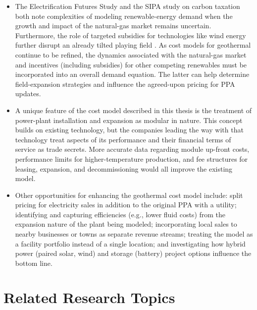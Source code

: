 \begin{itemize}
    \item The Electrification Futures Study \citep{murphy_electrification_2021} and the SIPA study on carbon taxation \citep{larson_energy_2018} both note complexities of modeling renewable-energy demand when the growth and impact of the natural-gas market remains uncertain. Furthermore, the role of targeted subsidies for technologies like wind energy further disrupt an already tilted playing field \citep[see][]{lazard_lazards_2020}. As cost models for geothermal continue to be refined, the dynamics associated with the natural-gas market and incentives (including subsidies) for other competing renewables must be incorporated into an overall demand equation. The latter can help determine field-expansion strategies and influence the agreed-upon pricing for PPA updates.
    \item A unique feature of the cost model described in this thesis is the treatment of power-plant installation and expansion as modular in nature. This concept builds on existing technology, but the companies leading the way with that technology treat aspects of its performance and their financial terms of service as trade secrets. More accurate data regarding module up-front costs, performance limits for higher-temperature production, and fee structures for leasing, expansion, and decommissioning would all improve the existing model.
    \item Other opportunities for enhancing the geothermal cost model include: split pricing for electricity sales in addition to the original PPA with a utility; identifying and capturing efficiencies (e.g., lower fluid costs) from the expansion nature of the plant being modeled; incorporating local sales to nearby businesses or towns as separate revenue streams; treating the model as a facility portfolio instead of a single location; and investigating how hybrid power (paired solar, wind) and storage (battery) project options influence the bottom line.
\end{itemize}

\section{Related Research Topics}\label{ch9:future_work_related}

